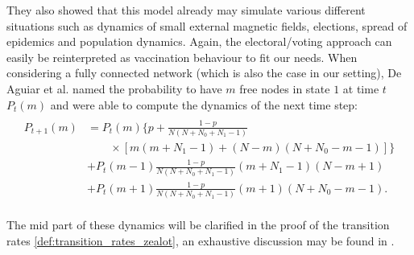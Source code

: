 \documentclass[12pt,a4paper,twoside]{article}
\begin{document}
They also showed that this model already may simulate various different situations such as dynamics of small external magnetic fields, elections, spread of epidemics and population dynamics. Again, the electoral/voting approach can easily be reinterpreted as vaccination behaviour to fit our needs. When considering a fully connected network (which is also the case in our setting), De Aguiar et al. named the probability to have $m$ free nodes in state $1$ at time $t$ $P_t\left(m\right)$ and were able to compute the dynamics of the next time step:
\begin{align}\label{eq:chinellato_dynamics}
	\begin{split}
	\begin{aligned}
		P_{t+1}\left(m\right) &= P_t\left(m\right)\lbrace p +\frac{1-p}{N\left(N+N_0+N_1-1\right)}\\
		&\qquad \times\left[m\left(m+N_1-1\right) +\left(N-m\right)\left(N+N_0-m-1\right)\right]\rbrace\\
		&+P_t\left(m-1\right)\frac{1-p}{N\left(N+N_0+N_1-1\right)}\left(m+N_1-1\right)\left(N-m+1\right)\\
		&+P_t\left(m+1\right)\frac{1-p}{N\left(N+N_0+N_1-1\right)}\left(m+1\right)\left(N+N_0-m-1\right).
	\end{aligned}
	\end{split}
\end{align}

The mid part of these dynamics will be clarified in the proof of the transition rates \eqref{def:transition_rates_zealot}, an exhaustive discussion may be found in \cite{Aguiar2011, Chinellato2015}. 
\end{document}
